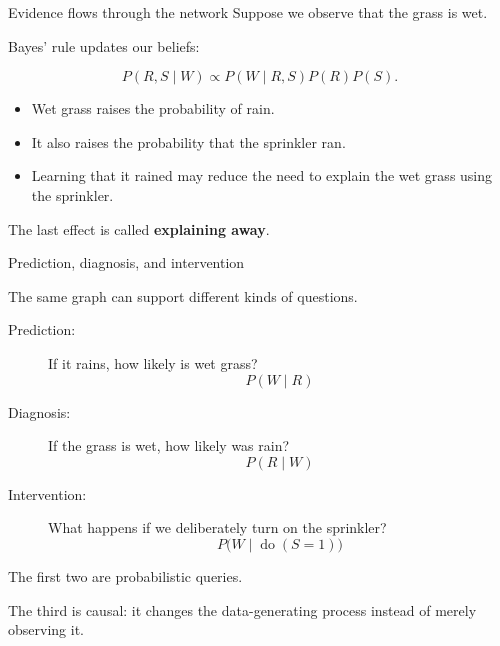 \documentclass[aspectratio=43,11pt]{beamer}
\begin{document}
\begin{frame}{Evidence flows through the network}
\footnotesize
Suppose we observe that the grass is wet.
\begin{center}
\end{center}

Bayes' rule updates our beliefs:

\[
P(R,S\mid W)
\propto
P(W\mid R,S)P(R)P(S).
\]

\begin{itemize}
  \item Wet grass raises the probability of rain.
  \item It also raises the probability that the sprinkler ran.
  \item Learning that it rained may reduce the need to explain the wet
        grass using the sprinkler.
\end{itemize}

The last effect is called \textbf{explaining away}.

\end{frame}

\begin{frame}{Prediction, diagnosis, and intervention}

The same graph can support different kinds of questions.

\begin{description}

  \item[Prediction:]
  If it rains, how likely is wet grass?
  \[
  P(W\mid R)
  \]

  \item[Diagnosis:]
  If the grass is wet, how likely was rain?
  \[
  P(R\mid W)
  \]

  \item[Intervention:]
  What happens if we deliberately turn on the sprinkler?
  \[
  P\bigl(W\mid \operatorname{do}(S=1)\bigr)
  \]

\end{description}

The first two are probabilistic queries.

The third is causal: it changes the data-generating process instead of
merely observing it.

\end{frame}
\end{document}
